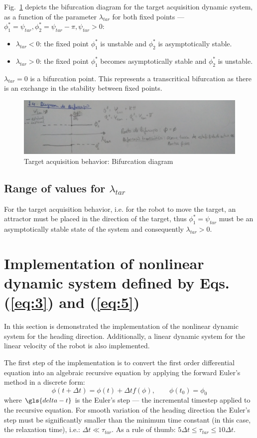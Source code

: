 Fig.~\ref{fig:1-4-bifurcation-diag} depicts the bifurcation diagram for the
target acquisition dynamic system, as a function of the parameter $\lambda_{tar}$
for both fixed points --- $\phi_1^* = \psi_{tar}, \phi_2^* = \psi_{tar} - \pi,
\psi_{tar} > 0$:
\begin{itemize}
\item $\lambda_{tar} < 0$: the fixed point $\phi_1^*$ is unstable and
  $\phi_2^*$ is asymptotically stable.
\item $\lambda_{tar} > 0$: the fixed point $\phi_1^*$ becomes asymptotically stable and $\phi_2^*$ is unstable.
\end{itemize}
%
$\lambda_{tar} = 0$ is a bifurcation point. This represents a transcritical bifurcation as there is an exchange in the
stability between fixed points.
%
\begin{figure}[!hbt]
\centering
    \includegraphics[width=1.0\textwidth]{./img/1-4-bifurcation.jpg}
  \caption{Target acquisition behavior: Bifurcation diagram}%
\label{fig:1-4-bifurcation-diag}
\end{figure}
%
\subsection{Range of values for $\lambda _{tar}$}%
\label{sec:range-tar}
For the target acquisition behavior, i.e. for the robot to move the target, an
attractor must be placed in the direction of the target, thus $\phi_1^* =
\psi_{tar}$ must be an asymptotically stable state of the system and consequently $\lambda_{tar} > 0$. 
\section{Implementation of nonlinear dynamic system defined by
  Eqs. (\ref{eq:3}) and (\ref{eq:5})}%
\label{sec:implem-study-tar-nonl}
In this section is demonstrated the implementation of the nonlinear dynamic
system for the heading direction. Additionally, a linear dynamic system for
the linear velocity of the robot is also implemented.

The first step of the implementation is to convert the first order differential
equation into an algebraic recursive equation by applying the forward Euler's
method in a discrete form:
\begin{equation}
  \label{eq:10}
  \phi(t + \Delta t) = \phi(t) + \Delta t f(\phi), \qquad \phi(t_0) = \phi_0
\end{equation}
where $\gls{delta-t}$ is the Euler's step --- the incremental timestep applied to
the recursive equation. For smooth variation of the heading direction the
Euler's step must be significantly smaller than the minimum time constant (in
this case, the relaxation time), i.e.: $\Delta t \ll \tau _{tar}$. As a rule of
thumb: $5 \Delta t \le \tau_{tar} \le 10 \Delta t$.

